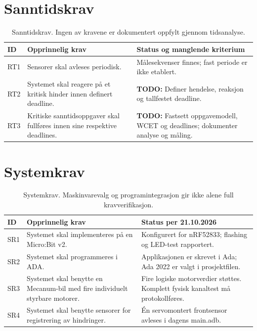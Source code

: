 \documentclass[a4paper,11pt,oneside]{report}
\newcommand{\todo}[1]{\textcolor{todocolor}{\textbf{TODO:} #1}}
\begin{document}
\section{Sanntidskrav}
\begin{table}[htbp]
\small
\begin{tabularx}{\textwidth}{@{}P{9mm}YP{46mm}@{}}
\toprule ID & Opprinnelig krav & Status og manglende kriterium\\\midrule
RT1 & Sensorer skal avleses periodisk.
& Målesekvenser finnes; fast periode er ikke etablert.\\
RT2 & Systemet skal reagere på et kritisk hinder innen definert deadline.
& \todo{Definer hendelse, reaksjon og tallfestet deadline.}\\
RT3 & Kritiske sanntidsoppgaver skal fullføres innen sine respektive deadlines.
& \todo{Fastsett oppgavemodell, WCET og deadlines; dokumenter analyse og måling.}\\
\bottomrule
\end{tabularx}
\caption{Sanntidskrav. Ingen av kravene er dokumentert oppfylt gjennom tidsanalyse.}
\label{tab:rt}
\end{table}

\section{Systemkrav}
\begin{table}[htbp]
\small
\begin{tabularx}{\textwidth}{@{}P{9mm}YP{46mm}@{}}
\toprule ID & Opprinnelig krav & Status per 21.10.2026\\\midrule
SR1 & Systemet skal implementeres på en Micro:Bit v2.
& Konfigurert for nRF52833; flashing og LED-test rapportert.\\
SR2 & Systemet skal programmeres i ADA.
& Applikasjonen er skrevet i Ada; Ada 2022 er valgt i prosjektfilen.\\
SR3 & Systemet skal benytte en Mecanum-bil med fire individuelt styrbare motorer.
& Fire logiske motorverdier støttes. Komplett fysisk kanaltest må protokollføres.\\
SR4 & Systemet skal benytte sensorer for registrering av hindringer.
& Én servomontert frontsensor avleses i dagens main.adb.\\
\bottomrule
\end{tabularx}
\caption{Systemkrav. Maskinvarevalg og programintegrasjon gir ikke alene full kravverifikasjon.}
\label{tab:sr}
\end{table}
\end{document}
